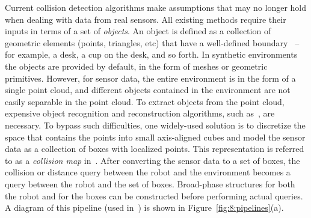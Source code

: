 Current collision detection algorithms make assumptions that may no
longer hold when dealing with data from real sensors.
All existing methods require their inputs in terms of a set of \emph{objects}.
An object is defined as a collection of geometric elements (points, triangles,
etc) that have a well-defined boundary~\cite{Alexe:2010:CVPR} -- for
example, a desk, a cup on the desk, and so forth.  In synthetic environments
the objects are provided by default, in the form of meshes or
geometric primitives. However, for sensor data, the entire environment
is in the form of a single point cloud, and different objects
contained in the environment are not easily separable in the point
cloud. To extract objects from the point cloud, expensive object
recognition and reconstruction algorithms, such
as~\cite{Muja:2011:ICRA}, are necessary. To bypass such difficulties,
one widely-used solution is to discretize the space that contains the points into small axis-aligned cubes and model the sensor data as a collection of boxes with localized points. This representation is referred to as
a \emph{collision map} in~\cite{Rusu:RPG:2009,Ioan:2010}. After
converting the sensor data to a set of boxes, the collision or
distance query between the robot and the environment becomes a query
between the robot and the set of boxes. Broad-phase structures for
both the robot and for the boxes can be constructed before performing
actual queries.  A diagram of this pipeline (used in~\cite{Rusu:RPG:2009,Ioan:2010}) is shown in
Figure~\ref{fig:8:pipelines}(a).

